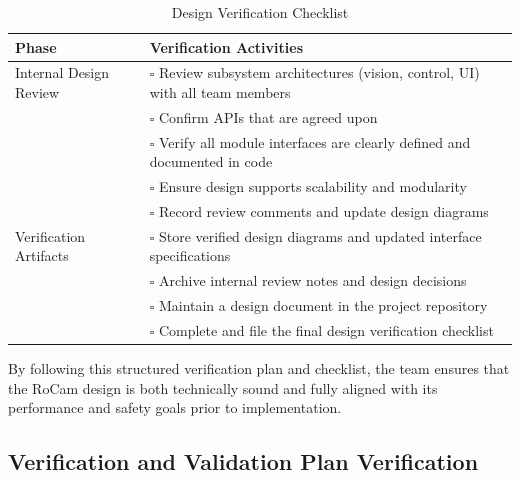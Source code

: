 \documentclass[12pt, titlepage]{article}
\begin{document}
\begin{table}[H]
  \centering
  \caption{Design Verification Checklist}
  \label{tab:design_verification_checklist}
  \renewcommand{\arraystretch}{1.3}
  \setlength{\tabcolsep}{8pt}
  \begin{tabular}{|p{4.4cm}|p{10.1cm}|}
    \hline
    \textbf{Phase}         & \textbf{Verification Activities}                                                     \\ \hline

    Internal Design Review & $\square$ \; Review subsystem architectures (vision,
    control, UI) with all team members                                                                            \\[-2pt]
                           & $\square$ \; Confirm APIs that are agreed upon                                       \\[-2pt]
                           & $\square$ \; Verify all module interfaces are clearly defined and documented in code \\[-2pt]
                           & $\square$ \; Ensure design supports scalability and modularity                       \\[-2pt]
                           & $\square$ \; Record review comments and update design diagrams                       \\ \hline

    Verification Artifacts & $\square$ \; Store verified design diagrams and
    updated interface specifications                                                                              \\[-2pt]
                           & $\square$ \; Archive internal review notes and design decisions                      \\[-2pt]
                           & $\square$ \; Maintain a design document in the project repository                    \\[-2pt]
                           & $\square$ \; Complete and file the final design verification checklist               \\ \hline
  \end{tabular}
\end{table}

\noindent
By following this structured verification plan and checklist, the team
ensures that the RoCam design is both technically sound and fully aligned
with its performance and safety goals prior to implementation.

\subsection{Verification and Validation Plan Verification}
\end{document}
